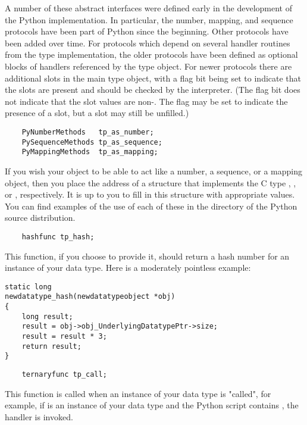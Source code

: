 A number of these abstract interfaces were defined early in the
development of the Python implementation.  In particular, the number,
mapping, and sequence protocols have been part of Python since the
beginning.  Other protocols have been added over time.  For protocols
which depend on several handler routines from the type implementation,
the older protocols have been defined as optional blocks of handlers
referenced by the type object.  For newer protocols there are
additional slots in the main type object, with a flag bit being set to
indicate that the slots are present and should be checked by the
interpreter.  (The flag bit does not indicate that the slot values are
non-\NULL. The flag may be set to indicate the presence of a slot,
but a slot may still be unfilled.)

\begin{verbatim}
    PyNumberMethods   tp_as_number;
    PySequenceMethods tp_as_sequence;
    PyMappingMethods  tp_as_mapping;
\end{verbatim}

If you wish your object to be able to act like a number, a sequence,
or a mapping object, then you place the address of a structure that
implements the C type ,
, or , respectively.
It is up to you to fill in this structure with appropriate values. You
can find examples of the use of each of these in the 
directory of the Python source distribution.


\begin{verbatim}
    hashfunc tp_hash;
\end{verbatim}

This function, if you choose to provide it, should return a hash
number for an instance of your data type. Here is a moderately
pointless example:

\begin{verbatim}
static long
newdatatype_hash(newdatatypeobject *obj)
{
    long result;
    result = obj->obj_UnderlyingDatatypePtr->size;
    result = result * 3;
    return result;
}
\end{verbatim}

\begin{verbatim}
    ternaryfunc tp_call;
\end{verbatim}

This function is called when an instance of your data type is "called",
for example, if  is an instance of your data type and the Python
script contains , the  handler is
invoked.

